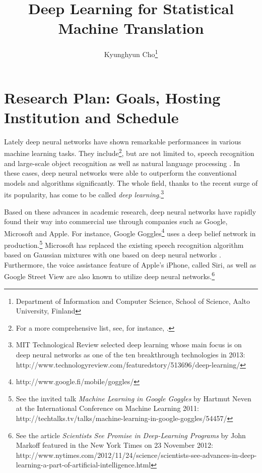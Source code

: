\documentclass[11pt, oneside]{essay}
\title{Deep Learning for Statistical Machine Translation}
\author{Kyunghyun Cho\thanks{Department of Information and
    Computer Science, School of Science, Aalto University,
             Finland}}
\begin{document}
\vspace{20mm}

\maketitle

\tableofcontents

\vfill

\newpage

\section{Research Plan: Goals, Hosting Institution and Schedule}

Lately deep neural networks have shown remarkable
performances in various machine learning tasks. They
include\footnote{For a more comprehensive list, see, for
instance, \citep{Bengio2013pami}.}, but are not
limited to, speech recognition \citep[see,
e.g.,][]{Hinton2012sp,Dahl2012} and large-scale object
recognition \citep[see, e.g.,][]{Krizhevsky2012,Hinton2012}
as well as natural language processing \citep[see,
e.g.,][]{Socher2011}. In these cases, deep neural networks
were able to outperform the conventional models and
algorithms significantly. The whole field, thanks to the recent
surge of its popularity, has come to be called \textit{deep
    learning}.\footnote{MIT Technological Review selected deep
learning whose main focus is on deep neural networks as one of the ten breakthrough technologies in
2013:
http://www.technologyreview.com/featuredstory/513696/deep-learning/
}

Based on these advances in academic research, deep neural
networks have rapidly found their way into commercial use
through companies such as Google, Microsoft and Apple.  For
instance, Google Goggles\footnote{
http://www.google.fi/mobile/goggles/} uses a deep belief
network in
production.\footnote{See the invited talk \textit{Machine
Learning in Google Goggles} by Hartmut Neven at the
International Conference on Machine Learning 2011:
http://techtalks.tv/talks/machine-learning-in-google-goggles/54457/}
Microsoft has replaced the existing speech recognition
algorithm based on Gaussian mixtures with one based on deep
neural networks \citep{Deng2013}. Furthermore, the voice
assistance feature of Apple's iPhone, called Siri, as well
as Google Street View are also known to utilize deep
neural networks.\footnote{See the article \textit{Scientists
See Promise in Deep-Learning Programs} by John Markoff
featured in the New York Times on 23 November 2012: \\
http://www.nytimes.com/2012/11/24/science/scientists-see-advances-in-deep-learning-a-part-of-artificial-intelligence.html
}
\end{document}
